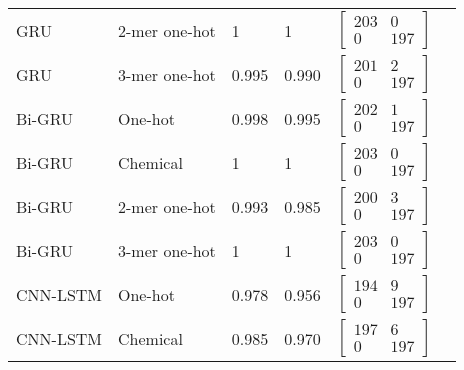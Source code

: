 \begin{longtable}{llllll}
    GRU & 2-mer one-hot & 1 & 1 &
    $\begin{bmatrix}
        203 & 0\\ 
        0 & 197
    \end{bmatrix}$
    \\

    GRU & 3-mer one-hot & 0.995 & 0.990 &
    $\begin{bmatrix}
        201 & 2\\ 
        0 & 197
    \end{bmatrix}$
    \\\midrule


    Bi-GRU & One-hot & 0.998 & 0.995 &
    $\begin{bmatrix}
        202 & 1\\ 
        0 & 197
    \end{bmatrix}$
    \\

    Bi-GRU & Chemical & 1 & 1 &
    $\begin{bmatrix}
        203 & 0\\ 
        0 & 197
    \end{bmatrix}$
    \\

    Bi-GRU & 2-mer one-hot & 0.993 & 0.985 &
    $\begin{bmatrix}
        200 & 3\\ 
        0 & 197
    \end{bmatrix}$
    \\

    Bi-GRU & 3-mer one-hot & 1 & 1 &
    $\begin{bmatrix}
        203 & 0\\ 
        0 & 197
    \end{bmatrix}$
    \\\midrule


    CNN-LSTM & One-hot & 0.978 & 0.956 &
    $\begin{bmatrix}
        194 & 9\\ 
        0 & 197
    \end{bmatrix}$
    \\

    CNN-LSTM & Chemical & 0.985 & 0.970 &
    $\begin{bmatrix}
        197 & 6\\ 
        0 & 197
    \end{bmatrix}$
    \\


\end{longtable}
